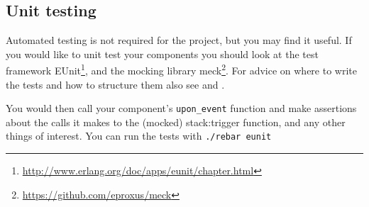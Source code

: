\documentclass[a4paper]{article}
\begin{document}
\subsection{Unit testing} %
\label{sub:unit_testing}

Automated testing is not required for the project, but you may find it useful.
If you would like to unit test your components you should look at the test
framework
EUnit\footnote{\url{http://www.erlang.org/doc/apps/eunit/chapter.html}}, and
the mocking library meck\footnote{\url{https://github.com/eproxus/meck}}. For
advice on where to write the tests and how to structure them also see
\cite{mochimedia_test} and \cite{so_eunit_q}.

You would then call your component's \verb!upon_event! function and make
assertions about the calls it makes to the (mocked) stack:trigger function,
and any other things of interest. You can run the tests with
\verb!./rebar eunit!


\end{document}
